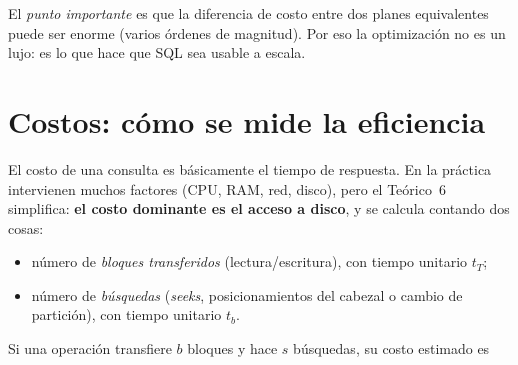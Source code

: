 \documentclass[11pt,a4paper]{article}
\begin{document}
\begin{center}
\end{center}

El \emph{punto importante} es que la diferencia de costo entre dos planes
equivalentes puede ser enorme (varios órdenes de magnitud). Por eso la
optimización no es un lujo: es lo que hace que SQL sea usable a escala.

\section{Costos: cómo se mide la eficiencia}

El costo de una consulta es básicamente el tiempo de respuesta. En la práctica
intervienen muchos factores (CPU, RAM, red, disco), pero el Teórico~6
simplifica: \textbf{el costo dominante es el acceso a disco}, y se calcula
contando dos cosas:

\begin{itemize}
    \item número de \emph{bloques transferidos} (lectura/escritura), con
    tiempo unitario $t_T$;
    \item número de \emph{búsquedas} (\emph{seeks}, posicionamientos del
    cabezal o cambio de partición), con tiempo unitario $t_b$.
\end{itemize}

Si una operación transfiere $b$ bloques y hace $s$ búsquedas, su costo
estimado es
\end{document}
